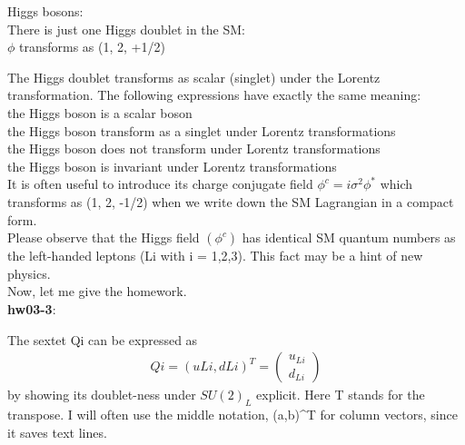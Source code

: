 \documentclass[12pt]{article}
\begin{document}
  Higgs bosons:\\

  There is just one Higgs doublet in the SM:\\

  $\phi$ transforms as (1, 2, +1/2)

  The Higgs doublet transforms as scalar (singlet) under the
  Lorentz transformation.  The following expressions have
  exactly the same meaning:\\

   the Higgs boson is a scalar boson\\
   the Higgs boson transform as a singlet under Lorentz transformations\\
   the Higgs boson does not transform under Lorentz transformations\\
   the Higgs boson is invariant under Lorentz transformations\\

  It is often useful to introduce its charge conjugate field
  $\phi^c = i \sigma^2 \phi^*$ which transforms as (1, 2, -1/2)
  when we write down the SM Lagrangian in a compact form.\\

  Please observe that the Higgs field $(\phi^c)$ has identical
  SM quantum numbers as the left-handed leptons (Li with
  i = 1,2,3).  This fact may be a hint of new physics.\\

  Now, let me give the homework.\\

{\bf hw03-3}:

  The sextet Qi can be expressed as
  \begin{eqnarray}
  Qi = (uLi, dLi)^T =
  \begin{pmatrix}
    u_{Li} \\ d_{Li}
  \end{pmatrix} 
  \end{eqnarray}
  by showing its doublet-ness under $SU(2)_L$ explicit.
  Here T stands for the transpose.  I will often use the middle
  notation, (a,b)^T for column vectors, since it saves text lines.\\
\end{document}

